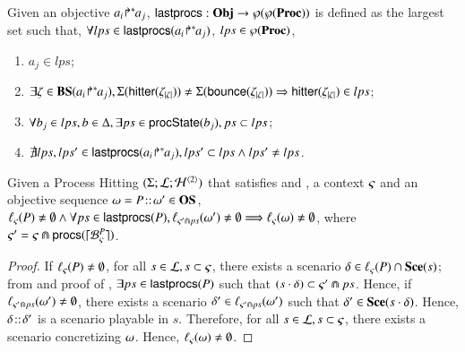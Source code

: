 \begin{definition}[$\lastprocs$]
\label{def:lastprocs}
Given an objective ${a_i\!\Rsh^*\!\!a_j}$, $\mathsf{lastprocs}:
\mathbf{Obj}\to\wp(\wp(\mathbf{Proc}))$ is
defined as the largest set such that, $\forall lps\in\mathsf{lastprocs}({a_i\!\Rsh^*\!\!a_j})$, 
$lps\in\wp(\mathbf{Proc})$,
\begin{enumerate}
\item $a_j\in lps$;
\item $\exists\zeta\in\mathbf{BS}({a_i\!\Rsh^*\!\!a_j}),
    \Sigma(\mathsf{hitter}(\zeta_{|\zeta|})) \neq 
		\Sigma(\mathsf{bounce}(\zeta_{|\zeta|}))
		 \Rightarrow
		  \mathsf{hitter}(\zeta_{|\zeta|})\in lps$;
\item $\forall b_j\in lps, b\in\Delta, \exists ps\in\mathsf{procState}(b_j), ps\subset lps$;
\item $\nexists lps, lps'\in\mathsf{lastprocs}({a_i\!\Rsh^*\!\!a_j}), lps'\subset lps \wedge
									lps'\neq lps$.
\end{enumerate}
\end{definition}

\begin{theorem}
\label{thm:ordered-ua}
Given a Process Hitting $(\Sigma; \mathcal{L}; \mathcal{H}^{\langle 2 \rangle})$
that satisfies  and ,
a context $\varsigma$ and an objective sequence $\omega =
P\!::\!\omega'\in\mathbf{OS}$,
$\ell_\varsigma(P)\neq\emptyset \wedge
	\forall ps \in\mathsf{lastprocs}(P),
	\ell_{\varsigma'\Cap ps}(\omega')\neq\emptyset
	\Longrightarrow \ell_\varsigma(\omega)\neq\emptyset$,
where $\varsigma' = \varsigma\Cap\mathsf{procs}(\lceil \mathcal{B}_{\varsigma}^{P}\rceil)$.
\end{theorem}
\begin{proof}
If $\ell_\varsigma(P)\neq\emptyset$,
for all $s\in \mathcal{L}, s\subset\varsigma$,
there exists a scenario $\delta\in\ell_\varsigma(P)\cap\mathbf{Sce}(s)$;
from  and proof of ,
$\exists ps\in\mathsf{lastprocs}(P)$ such that
$(s\cdot\delta)\subset\varsigma'\Cap ps$.
Hence, if $\ell_{\varsigma'\Cap ps}(\omega')\neq\emptyset$,
there exists a scenario $\delta'\in\ell_{\varsigma'\Cap ps}(\omega')$ such that
$\delta'\in\mathbf{Sce}(s\cdot\delta)$.
Hence, $\delta\!::\!\delta'$ is a scenario playable in $s$.
Therefore, for all $s\in \mathcal{L}, s\subset\varsigma$, there exists a scenario
concretizing $\omega$.
Hence, $\ell_\varsigma(\omega)\neq\emptyset$.
\end{proof}



